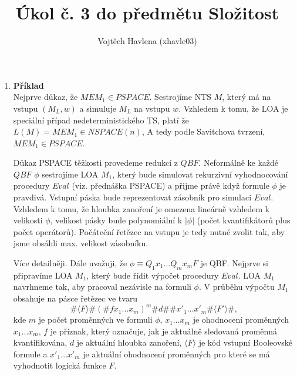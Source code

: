\documentclass[a4paper,12pt]{article}
\title{Úkol č. 3 do předmětu Složitost}
\author{Vojtěch Havlena (xhavle03)}
\date{}
\begin{document}
\maketitle


\begin{enumerate}[label=\textbf{\arabic*}.]

 \item {\bfseries Příklad}\\
  Nejprve důkaz, že $MEM_1 \in PSPACE$. Sestrojíme NTS $M$, který má na vstupu $(M_L, w)$ a simuluje $M_L$ na vstupu $w$. 
  Vzhledem k tomu, že LOA je speciální případ nedeterministického TS, platí že $L(M) = MEM_1 \in NSPACE(n)$,
  A tedy podle Savitchova tvrzení, $MEM_1\in PSPACE$.
  
  Důkaz PSPACE těžkosti provedeme redukcí z $QBF$. Neformálně ke každé $QBF$ $\phi$ sestrojíme LOA $M_1$, který 
  bude simulovat rekurzivní vyhodnocování procedury $Eval$ (viz. přednáška PSPACE) a přijme právě když formule $\phi$ je pravdivá. 
  Vstupní páska bude reprezentovat zásobník pro simulaci $Eval$. Vzhledem k tomu, že hloubka zanoření je 
  omezena lineárně vzhledem k velikosti $\phi$, velikost pásky bude polynomiální k $|\phi|$ (počet kvantifikátorů plus počet operátorů). Počáteční řetězec 
  na vstupu je tedy nutné zvolit tak, aby jsme obsáhli max. velikost zásobníku.
  
  Více detailněji. Dále uvažuji, že $\phi \equiv Q_1x_1\dots Q_mx_m F$ je QBF. Nejprve si připravíme LOA $M_1$, který bude řídit výpočet procedury $Eval$.
  LOA $M_1$ navrhneme tak, aby pracoval nezávisle na formuli $\phi$. V průběhu výpočtu $M_1$ 
  obsahuje na pásce řetězec ve tvaru 
  $$\#\langle F\rangle\#(\#f x_1\dots x_m)^m\# d\#\#x'_1\dots x'_m\#\langle F'\rangle\#,$$
  kde $m$ je počet proměnných ve formuli $\phi$, 
  $x_1 \dots x_m$ je ohodnocení proměnných $x_1\dots x_m$, $f$ je příznak, který označuje, 
  jak je aktuálně sledovaná proměnná kvantifikována, $d$ je aktuální hloubka zanoření, $\langle F\rangle$ je 
  kód vstupní Booleovské formule a $x'_1\dots x'_m$ je aktuální ohodnocení proměnných pro které se má vyhodnotit 
  logická funkce $F$. 
  

\end{enumerate}
\end{document}
